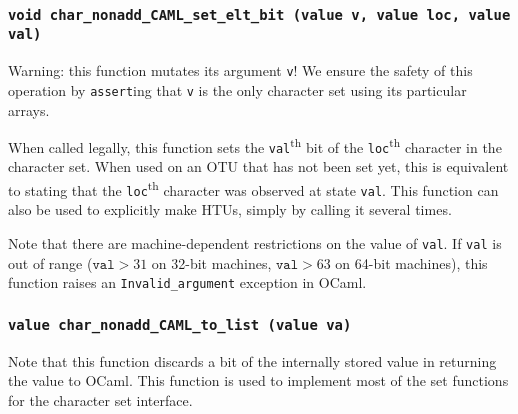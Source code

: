 \documentclass{article}
\begin{document}
\subsubsection*{\texttt{void char\_nonadd\_CAML\_set\_elt\_bit (value v, value loc, value val)}}
Warning: this function mutates its argument \texttt{v}!  We ensure the safety of
this operation by \texttt{assert}ing that \texttt{v} is the only character set
using its particular arrays.

When called legally, this function sets the \texttt{val}\textsuperscript{th} bit
of the \texttt{loc}\textsuperscript{th} character in the character set.  When
used on an OTU that has not been set yet, this is equivalent to stating that the
\texttt{loc}\textsuperscript{th} character was observed at state \texttt{val}.
This function can also be used to explicitly make HTUs, simply by calling it
several times.

Note that there are machine-dependent restrictions on the value of
\texttt{val}.  If \texttt{val} is out of range ($\mathtt{val}>31$ on 32-bit
machines, $\mathtt{val}>63$ on 64-bit machines), this function raises an
\texttt{Invalid\_argument} exception in OCaml.

\subsubsection*{\texttt{value char\_nonadd\_CAML\_to\_list (value va)}}
Note that this function discards a bit of the internally stored value in
returning the value to OCaml.  This function is used to implement most of the
set functions for the character set interface.
\end{document}
